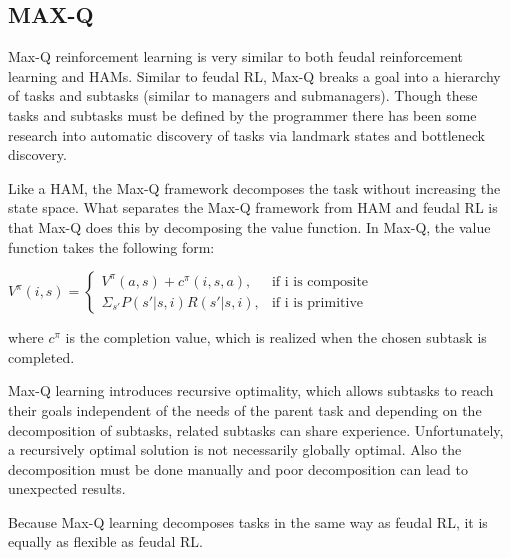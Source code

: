 \subsection{MAX-Q}
Max-Q reinforcement learning \cite{Dietterich} is very similar to both feudal reinforcement learning and
HAMs. Similar to feudal RL, Max-Q breaks a goal into a hierarchy of tasks
and subtasks (similar to managers and submanagers). Though these tasks and
subtasks must be defined by the programmer there has been some research into
automatic discovery of tasks via landmark states and bottleneck discovery.

Like a HAM, the Max-Q framework decomposes the task without increasing
the state space. What separates the Max-Q framework from HAM and feudal
RL is that Max-Q does this by decomposing the value function.
In Max-Q, the value function takes the following form:

\begin{math}
V^{\pi}(i, s) =
\begin{cases}
V^{\pi}(a, s) + c^{\pi}(i, s, a), & \text{if i is composite}\\
\Sigma_{s'}P(s'|s, i)R(s'|s, i), & \text{if i is primitive}
\end{cases}
\end{math}

where $c^{\pi}$ is the completion value, which is realized when the chosen
subtask is completed.

Max-Q learning introduces recursive optimality, which allows subtasks to reach
their goals independent of the needs of the parent task and depending on the
decomposition of subtasks, related subtasks can share experience. Unfortunately,
a recursively optimal solution is not necessarily globally optimal. Also
the decomposition must be done manually and poor decomposition can lead
to unexpected results.

Because Max-Q learning decomposes tasks in the same way as feudal RL, it is equally as
flexible as feudal RL.

